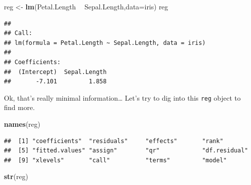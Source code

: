 \documentclass[
]{book}
\newenvironment{Shaded}{\begin{snugshade}}{\end{snugshade}}
\newcommand{\DataTypeTok}[1]{\textcolor[rgb]{0.13,0.29,0.53}{#1}}
\newcommand{\KeywordTok}[1]{\textcolor[rgb]{0.13,0.29,0.53}{\textbf{#1}}}
\newcommand{\NormalTok}[1]{#1}
\newcommand{\OperatorTok}[1]{\textcolor[rgb]{0.81,0.36,0.00}{\textbf{#1}}}
\newcommand{\StringTok}[1]{\textcolor[rgb]{0.31,0.60,0.02}{#1}}
\begin{document}
\begin{Shaded}
\begin{Highlighting}[]
\NormalTok{reg <-}\StringTok{ }\KeywordTok{lm}\NormalTok{(Petal.Length }\OperatorTok{~}\StringTok{ }\NormalTok{Sepal.Length,}\DataTypeTok{data=}\NormalTok{iris)}
\NormalTok{reg}
\end{Highlighting}
\end{Shaded}

\begin{verbatim}
## 
## Call:
## lm(formula = Petal.Length ~ Sepal.Length, data = iris)
## 
## Coefficients:
##  (Intercept)  Sepal.Length  
##       -7.101         1.858
\end{verbatim}

Ok, that's really minimal information\ldots{} Let's try to dig into this \texttt{reg} object to find more.

\begin{Shaded}
\begin{Highlighting}[]
\KeywordTok{names}\NormalTok{(reg)}
\end{Highlighting}
\end{Shaded}

\begin{verbatim}
##  [1] "coefficients"  "residuals"     "effects"       "rank"         
##  [5] "fitted.values" "assign"        "qr"            "df.residual"  
##  [9] "xlevels"       "call"          "terms"         "model"
\end{verbatim}

\begin{Shaded}
\begin{Highlighting}[]
\KeywordTok{str}\NormalTok{(reg)}
\end{Highlighting}
\end{Shaded}
\end{document}
